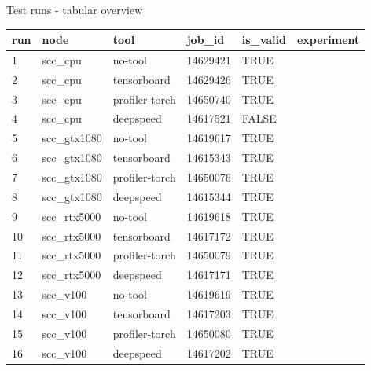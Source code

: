 \documentclass[compress,aspectratio=169]{beamer}
\begin{document}
\begin{frame}{Test runs - tabular overview}
\scriptsize{
\begin{table}[]
\begin{tabular}{@{}llllll@{}}
\toprule
run & node         & tool           & job\_id  & is\_valid & experiment \\ \midrule
1   & scc\_cpu     & no-tool        & 14629421 & TRUE      &            \\
2   & scc\_cpu     & tensorboard    & 14629426 & TRUE      &            \\
3   & scc\_cpu     & profiler-torch & 14650740 & TRUE      &            \\
4   & scc\_cpu     & deepspeed      & 14617521 & FALSE     &            \\
5   & scc\_gtx1080 & no-tool        & 14619617 & TRUE      &            \\
6   & scc\_gtx1080 & tensorboard    & 14615343 & TRUE      &            \\
7   & scc\_gtx1080 & profiler-torch & 14650076 & TRUE      &            \\
8   & scc\_gtx1080 & deepspeed      & 14615344 & TRUE      &            \\
9   & scc\_rtx5000 & no-tool        & 14619618 & TRUE      &            \\
10  & scc\_rtx5000 & tensorboard    & 14617172 & TRUE      &            \\
11  & scc\_rtx5000 & profiler-torch & 14650079 & TRUE      &            \\
12  & scc\_rtx5000 & deepspeed      & 14617171 & TRUE      &            \\
13  & scc\_v100    & no-tool        & 14619619 & TRUE      &            \\
14  & scc\_v100    & tensorboard    & 14617203 & TRUE      &            \\
15  & scc\_v100    & profiler-torch & 14650080 & TRUE      &            \\
16  & scc\_v100    & deepspeed      & 14617202 & TRUE      &           
\end{tabular}
\end{table}
}
\end{frame}
\end{document}
